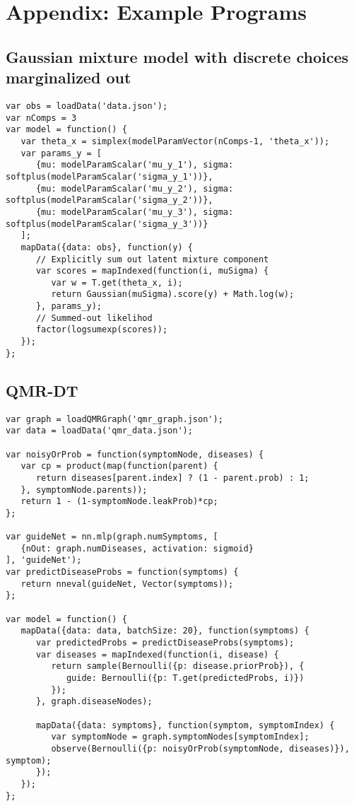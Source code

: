 \section{Appendix: Example Programs}
\label{sec:appendix_code}

\subsection{Gaussian mixture model with discrete choices marginalized out}
\label{sec:appendix_code:gmmSumOut}

\begin{lstlisting}
var obs = loadData('data.json');
var nComps = 3
var model = function() {
   var theta_x = simplex(modelParamVector(nComps-1, 'theta_x'));
   var params_y = [
      {mu: modelParamScalar('mu_y_1'), sigma: softplus(modelParamScalar('sigma_y_1'))},
      {mu: modelParamScalar('mu_y_2'), sigma: softplus(modelParamScalar('sigma_y_2'))},
      {mu: modelParamScalar('mu_y_3'), sigma: softplus(modelParamScalar('sigma_y_3'))}
   ];
   mapData({data: obs}, function(y) {
      // Explicitly sum out latent mixture component
      var scores = mapIndexed(function(i, muSigma) {
         var w = T.get(theta_x, i);
         return Gaussian(muSigma).score(y) + Math.log(w);
      }, params_y);
      // Summed-out likelihod
      factor(logsumexp(scores));
   });
};
\end{lstlisting}

\subsection{QMR-DT}
\label{sec:appendix_code:qmr}

\begin{lstlisting}
var graph = loadQMRGraph('qmr_graph.json');
var data = loadData('qmr_data.json');

var noisyOrProb = function(symptomNode, diseases) {
   var cp = product(map(function(parent) {
      return diseases[parent.index] ? (1 - parent.prob) : 1;
   }, symptomNode.parents));
   return 1 - (1-symptomNode.leakProb)*cp;
};

var guideNet = nn.mlp(graph.numSymptoms, [
   {nOut: graph.numDiseases, activation: sigmoid}
], 'guideNet');
var predictDiseaseProbs = function(symptoms) {
   return nneval(guideNet, Vector(symptoms));
};

var model = function() {
   mapData({data: data, batchSize: 20}, function(symptoms) {
      var predictedProbs = predictDiseaseProbs(symptoms);
      var diseases = mapIndexed(function(i, disease) {
         return sample(Bernoulli({p: disease.priorProb}), {
            guide: Bernoulli({p: T.get(predictedProbs, i)})
         });
      }, graph.diseaseNodes);

      mapData({data: symptoms}, function(symptom, symptomIndex) {
         var symptomNode = graph.symptomNodes[symptomIndex];
         observe(Bernoulli({p: noisyOrProb(symptomNode, diseases)}), symptom);
      });
   });
};
\end{lstlisting}

